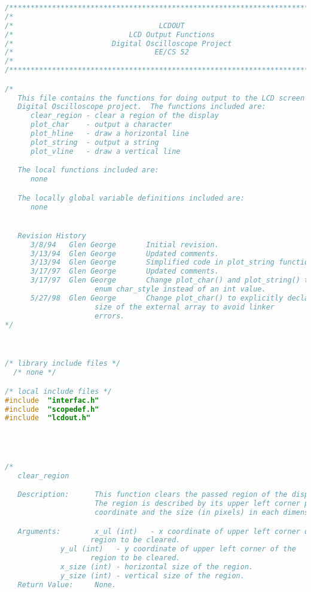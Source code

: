 \begin{lstlisting}[language=C]
/****************************************************************************/
/*                                                                          */
/*                                  LCDOUT                                  */
/*                           LCD Output Functions                           */
/*                       Digital Oscilloscope Project                       */
/*                                 EE/CS 52                                 */
/*                                                                          */
/****************************************************************************/

/*
   This file contains the functions for doing output to the LCD screen for the
   Digital Oscilloscope project.  The functions included are:
      clear_region - clear a region of the display
      plot_char    - output a character
      plot_hline   - draw a horizontal line
      plot_string  - output a string
      plot_vline   - draw a vertical line

   The local functions included are:
      none

   The locally global variable definitions included are:
      none


   Revision History
      3/8/94   Glen George       Initial revision.
      3/13/94  Glen George       Updated comments.
      3/13/94  Glen George       Simplified code in plot_string function.
      3/17/97  Glen George       Updated comments.
      3/17/97  Glen George       Change plot_char() and plot_string() to use
			         enum char_style instead of an int value.
      5/27/98  Glen George       Change plot_char() to explicitly declare the
			         size of the external array to avoid linker
			         errors.
*/



/* library include files */
  /* none */

/* local include files */
#include  "interfac.h"
#include  "scopedef.h"
#include  "lcdout.h"




/*
   clear_region

   Description:      This function clears the passed region of the display.
                     The region is described by its upper left corner pixel
                     coordinate and the size (in pixels) in each dimension.

   Arguments:        x_ul (int)   - x coordinate of upper left corner of the
   				    region to be cleared.
   		     y_ul (int)   - y coordinate of upper left corner of the
   				    region to be cleared.
		     x_size (int) - horizontal size of the region.
		     y_size (int) - vertical size of the region.
   Return Value:     None.


\end{lstlisting}
